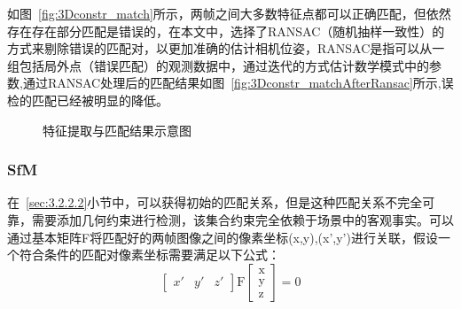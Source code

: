 如图~\ref{fig:3Dconstr_match}所示，两帧之间大多数特征点都可以正确匹配，但依然存在存在部分匹配是错误的，在本文中，选择了RANSAC（随机抽样一致性）的方式来剔除错误的匹配对，以更加准确的估计相机位姿，RANSAC是指可以从一组包括局外点（错误匹配）的观测数据中，通过迭代的方式估计数学模式中的参数,通过RANSAC处理后的匹配结果如图~\ref{fig:3Dconstr_matchAfterRansac}所示,误检的匹配已经被明显的降低。
\begin{figure}[H]
    \centering
    \vskip0.5cm
    \vskip0.5cm
    \caption{特征提取与匹配结果示意图}
    \label{fig:3Dconstrmatch}
\end{figure}
\subsubsection{SfM} 
\label{sec:3.2.2.3}
在~\ref{sec:3.2.2.2}小节中，可以获得初始的匹配关系，但是这种匹配关系不完全可靠，需要添加几何约束进行检测，该集合约束完全依赖于场景中的客观事实。可以通过基本矩阵F将匹配好的两帧图像之间的像素坐标(x,y),(x',y')进行关联，假设一个符合条件的匹配对像素坐标需要满足以下公式：
\begin{equation}
\begin{bmatrix}x'&y'&z'\end{bmatrix}\mathrm F\begin{bmatrix}\mathrm x\\\mathrm y\\\mathrm z\end{bmatrix}=0
\end{equation}

